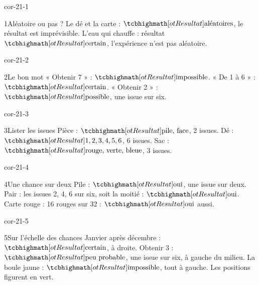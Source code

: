 \clearpage\pagestyle{otMain}\setlength{\otBlocEspacement}{2.5mm}\fontsize{11}{15}\selectfont{}
\begin{blocLivre}{cor-21-1}\begin{corrige}{1}{Aléatoire ou pas ?}
Le dé et la carte : $\res{\text{aléatoires}}$, le résultat est imprévisible. L’eau qui chauffe : résultat $\res{\text{certain}}$, l’expérience n’est pas aléatoire.
\end{corrige}\end{blocLivre}
\begin{blocLivre}{cor-21-2}\begin{corrige}{2}{Le bon mot}
« Obtenir 7 » : $\res{\text{impossible}}$. « De 1 à 6 » : $\res{\text{certain}}$. « Obtenir 2 » : $\res{\text{possible}}$, une issue sur six.
\end{corrige}\end{blocLivre}
\begin{blocLivre}{cor-21-3}\begin{corrige}{3}{Lister les issues}
Pièce : $\res{\text{pile, face}}$, 2 issues. Dé : $\res{1,2,3,4,5,6}$, 6 issues. Sac : $\res{\text{rouge, verte, bleue}}$, 3 issues.
\end{corrige}\end{blocLivre}
\begin{blocLivre}{cor-21-4}\begin{corrige}{4}{Une chance sur deux}
Pile : $\res{\text{oui}}$, une issue sur deux. Pair : les issues 2, 4, 6 sur six, soit la moitié : $\res{\text{oui}}$. Carte rouge : 16 rouges sur 32 : $\res{\text{oui}}$ aussi.
\end{corrige}\end{blocLivre}
\begin{blocLivre}{cor-21-5}\begin{corrige}{5}{Sur l’échelle des chances}
Janvier après décembre : $\res{\text{certain}}$, à droite. Obtenir 3 : $\res{\text{peu probable}}$, une issue sur six, à gauche du milieu. La boule jaune : $\res{\text{impossible}}$, tout à gauche. Les positions figurent en vert.
\label{fig-cor-21-5}
\end{corrige}\end{blocLivre}

